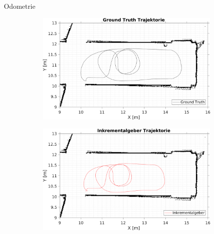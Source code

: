 \documentclass{beamer}
\begin{document}
%
%
\begin{frame}{Odometrie}

	\begin{figure}
		\centering
		\begin{subfigure}{0.47\linewidth}
			\centering
			\includegraphics[width=\linewidth]{Record_2018-02-08-12-33-53_trajectory1}
		\end{subfigure}
		\hfill
		\begin{subfigure}{0.47\linewidth}
			\centering
			\includegraphics[width=\linewidth]{Record_2018-02-08-12-33-53_trajectory2}
		\end{subfigure}
		\par
		\bigskip
		\begin{subfigure}{0.47\linewidth}

\end{subfigure}
\end{figure}
\end{frame}
\end{document}
